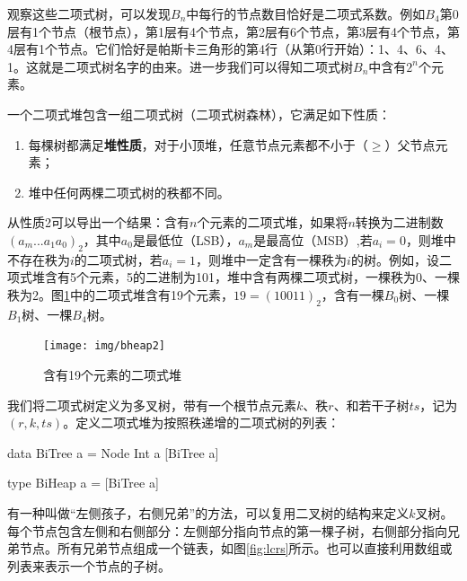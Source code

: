 \documentclass[b5paper]{ctexart}
\begin{document}
观察这些二项式树，可以发现$B_n$中每行的节点数目恰好是二项式系数。例如$B_4$第0层有1个节点（根节点），第1层有4个节点，第2层有6个节点，第3层有4个节点，第4层有1个节点。它们恰好是帕斯卡三角形的第4行（从第0行开始）：1、4、6、4、1。这就是二项式树名字的由来。进一步我们可以得知二项式树$B_n$中含有$2^n$个元素。

一个二项式堆包含一组二项式树（二项式树森林），它满足如下性质：

\begin{enumerate}
\item 每棵树都满足\textbf{堆性质}，对于小顶堆，任意节点元素都不小于（$\geq$）父节点元素；
\item 堆中任何两棵二项式树的秩都不同。
\end{enumerate}

从性质2可以导出一个结果：含有$n$个元素的二项式堆，如果将$n$转换为二进制数$(a_m ... a_1 a_0)_2$，其中$a_0$是最低位（LSB），$a_m$是最高位（MSB）,若$a_i=0$，则堆中不存在秩为$i$的二项式树，若$a_i = 1$，则堆中一定含有一棵秩为$i$的树。例如，设二项式堆含有5个元素，5的二进制为101，堆中含有两棵二项式树，一棵秩为0、一棵秩为2。图\ref{fig:bheap2}中的二项式堆含有19个元素，$19 = (10011)_2$，含有一棵$B_0$树、一棵$B_1$树、一棵$B_4$树。

\begin{figure}[htbp]
  \centering
  \texttt{[image: img/bheap2]}
  \caption{含有19个元素的二项式堆}
  \label{fig:bheap2}
\end{figure}

我们将二项式树定义为多叉树，带有一个根节点元素$k$、秩$r$、和若干子树$ts$，记为$(r, k, ts)$。定义二项式堆为按照秩递增的二项式树的列表：

\lstset{frame=single}
\begin{Haskell}
data BiTree a = Node Int a [BiTree a]

type BiHeap a = [BiTree a]
\end{Haskell}

有一种叫做“左侧孩子，右侧兄弟”\cite{CLRS}的方法，可以复用二叉树的结构来定义$k$叉树。每个节点包含左侧和右侧部分：左侧部分指向节点的第一棵子树，右侧部分指向兄弟节点。所有兄弟节点组成一个链表，如图\ref{fig:lcrs}所示。也可以直接利用数组或列表来表示一个节点的子树。
\end{document}
